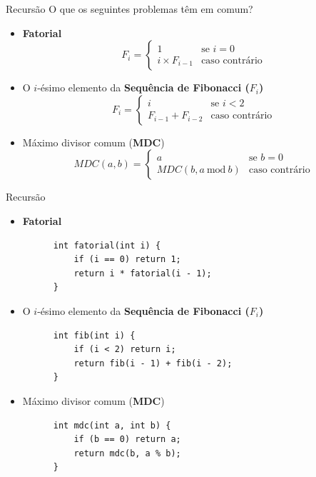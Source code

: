 \documentclass[handout]{beamer}
\begin{document}
\begin{frame}{Recursão}
  O que os seguintes problemas têm em comum?
  \begin{itemize}

    \item \textbf{Fatorial}
    \begin{equation*}
      F_i =
      \begin{cases}
        1                & \text{se } i = 0 \\
        i \times F_{i-1} & \text{caso contrário}
      \end{cases}
    \end{equation*}

    \item  O $i$-ésimo elemento da \textbf{Sequência de
    Fibonacci ($F_i$)}
    \begin{equation*}
      F_i =
      \begin{cases}
        i                 & \text{se } i < 2 \\
        F_{i-1} + F_{i-2} & \text{caso contrário}
      \end{cases}
    \end{equation*}

    \item Máximo divisor comum (\textbf{MDC})
    \begin{equation*}
      MDC(a, b) =
      \begin{cases}
        a                        & \text{se } b = 0 \\
        MDC(b, a~\mathrm{mod}~b) & \text{caso contrário}
      \end{cases}
    \end{equation*}

  \end{itemize}
\end{frame}

\begin{frame}[fragile]{Recursão}
  \begin{itemize}
    \item \textbf{Fatorial}
    \begin{verbatim}
      int fatorial(int i) {
          if (i == 0) return 1;
          return i * fatorial(i - 1);
      }
    \end{verbatim}

    \item  O $i$-ésimo elemento da \textbf{Sequência de
    Fibonacci ($F_i$)}
    \begin{verbatim}
      int fib(int i) {
          if (i < 2) return i;
          return fib(i - 1) + fib(i - 2);
      }
    \end{verbatim}
    \item Máximo divisor comum (\textbf{MDC})
    \begin{verbatim}
      int mdc(int a, int b) {
          if (b == 0) return a;
          return mdc(b, a % b);
      }
    \end{verbatim}
  \end{itemize}
\end{frame}
\end{document}
